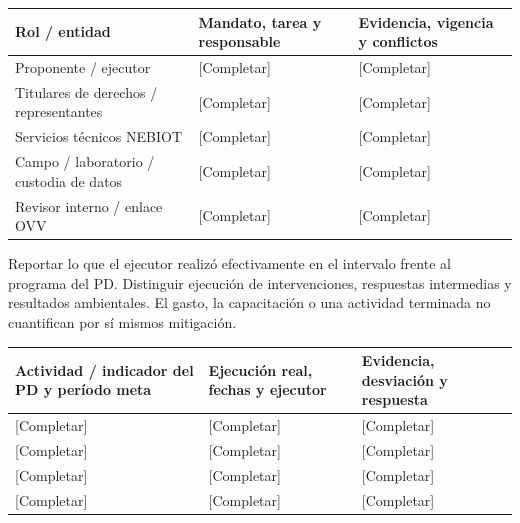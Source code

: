 {\sffamily\fontsize{8.6}{10.7}\selectfont\begin{longtable}{@{}P{48mm}P{61mm}P{53mm}@{}}
\toprule
\textbf{Rol / entidad} & \textbf{Mandato, tarea y responsable} & \textbf{Evidencia, vigencia y conflictos}\\\midrule\endhead
\rule{0pt}{8mm}Proponente / ejecutor & [Completar] & [Completar]\\\hline
\rule{0pt}{8mm}Titulares de derechos / representantes & [Completar] & [Completar]\\\hline
\rule{0pt}{8mm}Servicios técnicos NEBIOT & [Completar] & [Completar]\\\hline
\rule{0pt}{8mm}Campo / laboratorio / custodia de datos & [Completar] & [Completar]\\\hline
\rule{0pt}{8mm}Revisor interno / enlace OVV & [Completar] & [Completar]\\\hline
\end{longtable}}
Reportar lo que el ejecutor realizó efectivamente en el intervalo frente al programa del PD. Distinguir ejecución de intervenciones, respuestas intermedias y resultados ambientales. El gasto, la capacitación o una actividad terminada no cuantifican por sí mismos mitigación.\par
{}
{\sffamily\fontsize{8.6}{10.7}\selectfont\begin{longtable}{@{}P{48mm}P{61mm}P{53mm}@{}}
\toprule
\textbf{Actividad / indicador del PD y período meta} & \textbf{Ejecución real, fechas y ejecutor} & \textbf{Evidencia, desviación y respuesta}\\\midrule\endhead
\rule{0pt}{8mm}[Completar] & [Completar] & [Completar]\\\hline
\rule{0pt}{8mm}[Completar] & [Completar] & [Completar]\\\hline
\rule{0pt}{8mm}[Completar] & [Completar] & [Completar]\\\hline
\rule{0pt}{8mm}[Completar] & [Completar] & [Completar]\\\hline
\end{longtable}}
